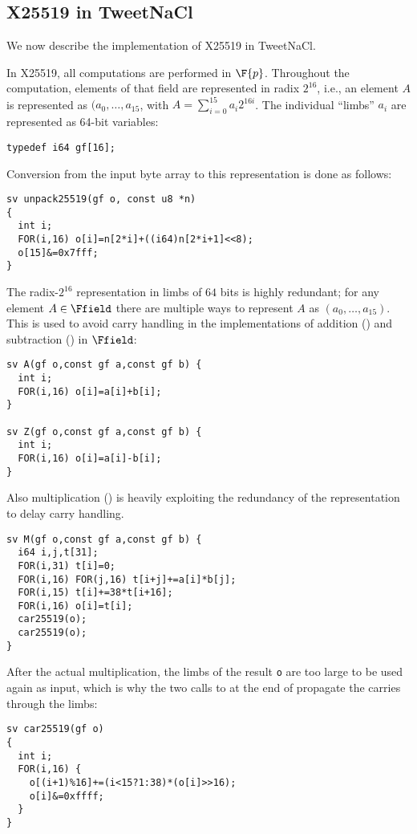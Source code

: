 \subsection{X25519 in TweetNaCl}
\label{subsec:X25519-TweetNaCl}

We now describe the implementation of X25519 in TweetNaCl.

In X25519, all computations are performed in $\F{p}$.
Throughout the computation, elements of that field
are represented in radix $2^{16}$,
i.e., an element $A$ is represented as $(a_0,\dots,a_{15}$,
with $A = \sum_{i=0}^{15}a_i2^{16i}$.
The individual ``limbs'' $a_i$ are represented as
64-bit  variables:
\begin{lstlisting}[language=Ctweetnacl]
typedef i64 gf[16];
\end{lstlisting}

Conversion from the input byte array to this representation is done
as follows:
\begin{lstlisting}[language=Ctweetnacl]
sv unpack25519(gf o, const u8 *n)
{
  int i;
  FOR(i,16) o[i]=n[2*i]+((i64)n[2*i+1]<<8);
  o[15]&=0x7fff;
}
\end{lstlisting}

The radix-$2^{16}$ representation in limbs of $64$ bits is
highly redundant; for any element $A \in \Ffield$ there are
multiple ways to represent $A$ as $(a_0,\dots,a_{15})$.
This is used to avoid carry handling in the implementations of addition
() and subtraction () in $\Ffield$:
\begin{lstlisting}[language=Ctweetnacl]
sv A(gf o,const gf a,const gf b) {
  int i;
  FOR(i,16) o[i]=a[i]+b[i];
}

sv Z(gf o,const gf a,const gf b) {
  int i;
  FOR(i,16) o[i]=a[i]-b[i];
}
\end{lstlisting}

Also multiplication () is heavily exploiting the redundancy
of the representation to delay carry handling.
\begin{lstlisting}[language=Ctweetnacl]
sv M(gf o,const gf a,const gf b) {
  i64 i,j,t[31];
  FOR(i,31) t[i]=0;
  FOR(i,16) FOR(j,16) t[i+j]+=a[i]*b[j];
  FOR(i,15) t[i]+=38*t[i+16];
  FOR(i,16) o[i]=t[i];
  car25519(o);
  car25519(o);
}
\end{lstlisting}

After the actual multiplication, the limbs of the result \texttt{o} are
too large to be used again as input, which is why the two calls to
 at the end of  propagate the carries through the limbs:
\begin{lstlisting}[language=Ctweetnacl]
sv car25519(gf o)
{
  int i;
  FOR(i,16) {
    o[(i+1)%16]+=(i<15?1:38)*(o[i]>>16);
    o[i]&=0xffff;
  }
}
\end{lstlisting}

